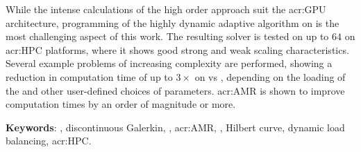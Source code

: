 \begin{adjustwidth}{-0.5in}{-0.5in}
While the intense calculations of the high order approach suit the \acrshort{acr:GPU} architecture,
programming of the highly dynamic adaptive algorithm on  is the most challenging
aspect of this work. The resulting solver is tested on up to \(64\)  on
\acrshort{acr:HPC} platforms, where it shows good strong and weak scaling characteristics. Several
example problems of increasing complexity are performed, showing a reduction in computation time of
up to \(3 \times \) on  vs , depending on the loading of the
 and other user-defined choices of parameters. \Acrshort{acr:AMR} is shown to
improve computation times by an order of magnitude or more.

\begin{footnotesize}
\begin{spacing}{1.125}
\vspace*{\fill}
\noindent
\textbf{Keywords}: , discontinuous Galerkin, ,
\acrlong{acr:AMR}, , Hilbert curve, dynamic load balancing, \acrlong{acr:HPC}.
\end{spacing}
\end{footnotesize}

\end{adjustwidth}
